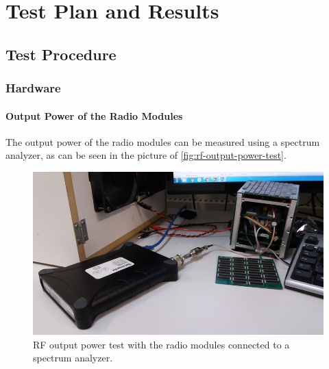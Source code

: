 %
%
%
%
%

%
%
%
%
%
%

\chapter{Test Plan and Results} \label{ch:test-plan}

\section{Test Procedure}

\subsection{Hardware}

\subsubsection{Output Power of the Radio Modules}

The output power of the radio modules can be measured using a spectrum analyzer, as can be seen in the picture of \autoref{fig:rf-output-power-test}.

\begin{figure}[!ht]
    \begin{center}
        \includegraphics[width=\textwidth]{figures/rf-output-power-test.jpg}
        \caption{RF output power test with the radio modules connected to a spectrum analyzer.}
        \label{fig:rf-output-power-test}
    \end{center}
\end{figure}

